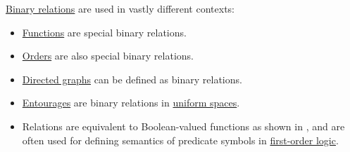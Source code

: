 \begin{example}\label{ex:def:binary_relation}
  \hyperref[def:binary_relation]{Binary relations} are used in vastly different contexts:
  \begin{itemize}
    \item \hyperref[def:function]{Functions} are special binary relations.
    \item \hyperref[sec:order_theory]{Orders} are also special binary relations.
    \item \hyperref[def:directed_graph]{Directed graphs} can be defined as binary relations.
    \item \hyperref[def:entourage]{Entourages} are binary relations in \hyperref[def:uniform_space]{uniform spaces}.
    \item Relations are equivalent to Boolean-valued functions as shown in , and are often used for defining semantics of predicate symbols in \hyperref[subsec:first_order_logic]{first-order logic}.
  \end{itemize}
\end{example}


